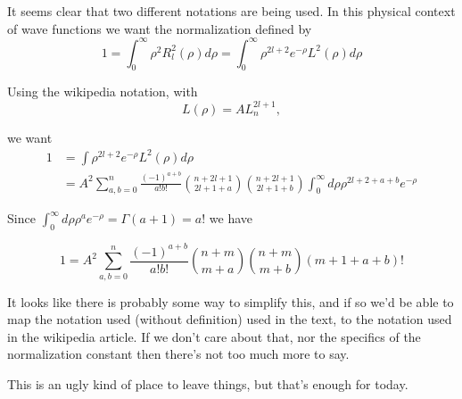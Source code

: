It seems clear that two different notations are being used.  In this physical context of wave functions we want the normalization defined by
\begin{equation}\label{eqn:hyrdogenLaguerre:160}
1 = \int_0^\infty \rho^2 R_l^2(\rho) d\rho = \int_0^\infty \rho^{2l + 2} e^{-\rho} L^2(\rho) d\rho
\end{equation}

Using the wikipedia notation, with
\begin{equation}\label{eqn:hyrdogenLaguerre:170}
L(\rho) = A L_n^{2l+1},
\end{equation}

we want
\begin{align*}
1 
&= \int \rho^{2l + 2} e^{-\rho} L^2(\rho) d\rho \\
&= 
A^2 \sum_{a,b=0}^n \frac{(-1)^{a+b}}{a!b!} 
\binom{n+2l+1}{2l+1+a}
\binom{n+2l+1}{2l+1+b}
\int_0^\infty d\rho \rho^{2l + 2 + a + b} e^{-\rho} 
\end{align*}

Since $\int_0^\infty d\rho \rho^{a} e^{-\rho} = \Gamma(a+1) = a!$ we have

\begin{equation}\label{eqn:hyrdogenLaguerre:180}
1 = A^2 \sum_{a,b=0}^n \frac{(-1)^{a+b}}{a!b!} 
\binom{n+m}{m+a}
\binom{n+m}{m+b}
(m + 1 + a + b)!
\end{equation}

It looks like there is probably some way to simplify this, and if so we'd be able to map the notation used (without definition) used in the text, to the notation used in the wikipedia article.  If we don't care about that, nor the specifics of the normalization constant then there's not too much more to say.

This is an ugly kind of place to leave things, but that's enough for today.

\EndArticle
